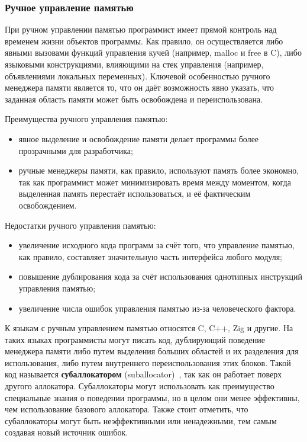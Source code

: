 \subsubsection*{Ручное управление памятью}

При ручном управлении памятью программист имеет прямой контроль над временем жизни объектов программы. Как правило, он осуществляется либо явными вызовами функций управления кучей (например, malloc и free в C), либо языковыми конструкциями, влияющими на стек управления (например, объявлениями локальных переменных). Ключевой особенностью ручного менеджера памяти является то, что он даёт возможность явно указать, что заданная область памяти может быть освобождена и переиспользована.~\cite{mm_overview}

Преимущества ручного управления памятью: 

\begin{itemize}[label*=---]
	\item явное выделение и освобождение памяти делает программы более прозрачными для разработчика;
	\item ручные менеджеры памяти, как правило, используют память более экономно, так как программист может минимизировать время между моментом, когда выделенная память перестаёт использоваться, и её фактическим освобождением.
\end{itemize}

Недостатки ручного управления памятью: 

\begin{itemize}[label*=---]
	\item увеличение исходного кода программ за счёт того, что управление памятью, как правило, составляет значительную часть интерфейса любого модуля;
	\item повышение дублирования кода за счёт использования однотипных инструкций управления памятью;
	\item увеличение числа ошибок управления памятью из-за человеческого фактора.
\end{itemize}

К языкам с ручным управлением памятью относятся C, C++, Zig и другие. На таких языках программисты могут писать код, дублирующий поведение менеджера памяти либо путем выделения больших областей и их разделения для использования, либо путем внутреннего переиспользования этих блоков. Такой код называется \textbf{субаллокатором} (suballocator)~\cite{glossary}, так как он работает поверх другого аллокатора. Субаллокаторы могут использовать как преимущество специальные знания о поведении программы, но в целом они менее эффективны, чем использование базового аллокатора. Также стоит отметить, что субаллокаторы могут быть неэффективными или ненадежными, тем самым создавая новый источник ошибок.~\cite{allocator}

